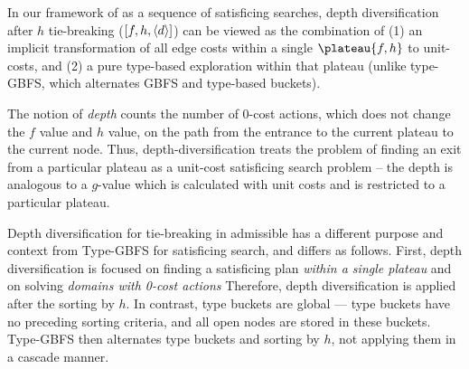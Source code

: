 
In our framework of \astar as a sequence of satisficing searches, depth diversification after $h$ tie-breaking ($[f,h,{\left<d\right>}]$) can be viewed as the combination of (1) an implicit transformation of all edge costs within a single $\plateau{f,h}$ to unit-costs, and (2) a pure type-based exploration within that plateau (unlike type-GBFS, which alternates GBFS and type-based buckets).
 
The notion of \emph{depth} counts the number of 0-cost actions, which does not change the $f$ value and $h$
value, on the path from the entrance to the current plateau to the current node.  Thus, 
depth-diversification treats  the problem of finding an exit from a particular plateau as a unit-cost satisficing search problem
-- the depth is analogous to a $g$-value which is calculated with unit costs and is restricted to a particular plateau.

Depth diversification for tie-breaking in admissible \astar has a different purpose and context from Type-GBFS for satisficing search,
and differs as follows.
First, depth diversification  is focused on finding a satisficing plan \emph{within a single plateau} and on solving \emph{domains with 0-cost actions} %
Therefore, depth diversification is applied after the sorting by $h$.
In contrast, type buckets are global --- type buckets have no preceding sorting criteria, and all open nodes are stored in these buckets. Type-GBFS then alternates type buckets and sorting by $h$, not applying them in a cascade manner.

